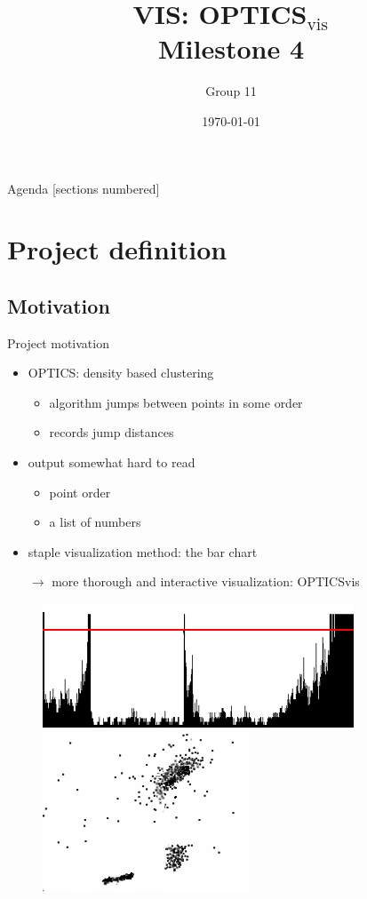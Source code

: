 \documentclass[naustrian]{beamer}
\title{VIS: OPTICS$_\text{vis}$\\Milestone 4}
\date{\today}
\author{Group 11}
\institute{Fakultät für Informatik}
\begin{document}
\maketitle

\begin{frame}{Agenda}
    [sections numbered]
    \tableofcontents
\end{frame}

\section{Project definition}

\subsection{Motivation}

\begin{frame}{Project motivation}
    \begin{itemize}
        \item OPTICS: density based clustering
            \begin{itemize}
                \item algorithm jumps between points in some order
                \item records jump distances
            \end{itemize}
        \item output somewhat hard to read
            \begin{itemize}
                \item point order
                \item a list of numbers
            \end{itemize}
        \item staple visualization method: the bar chart
        \item[$\rightarrow$] more thorough and interactive visualization: OPTICSvis
    \end{itemize}
    \begin{figure}[h]
        \centering
        \includegraphics[height=.3\textheight]{img/optics-edited}
        \vspace{1em}
        \includegraphics[width=.3\textwidth]{img/optics-edited-points-black}
    \end{figure}
\end{frame}
\end{document}
